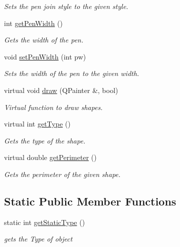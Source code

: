 \begin{DoxyCompactItemize}
\begin{DoxyCompactList}\small\item\em Sets the pen join style to the given style. \end{DoxyCompactList}\item 
int \hyperlink{classPolyline_ab01dd06f45e43dc9e6617596065fee70}{get\+Pen\+Width} ()
\begin{DoxyCompactList}\small\item\em Gets the width of the pen. \end{DoxyCompactList}\item 
void \hyperlink{classPolyline_aeb5424c425e44adff787367a497fc024}{set\+Pen\+Width} (int pw)
\begin{DoxyCompactList}\small\item\em Sets the width of the pen to the given width. \end{DoxyCompactList}\item 
virtual void \hyperlink{classPolyline_ac5b5a4ac26b140a7dc30cc293638e3ee}{draw} (Q\+Painter \&, bool)
\begin{DoxyCompactList}\small\item\em Virtual function to draw shapes. \end{DoxyCompactList}\item 
virtual int \hyperlink{classPolyline_a6138f6313141e81d989622806476c3d2}{get\+Type} ()
\begin{DoxyCompactList}\small\item\em Gets the type of the shape. \end{DoxyCompactList}\item 
virtual double \hyperlink{classPolyline_ad5425297b32d53a0f74eda253d4540f7}{get\+Perimeter} ()
\begin{DoxyCompactList}\small\item\em Gets the perimeter of the given shape. \end{DoxyCompactList}\end{DoxyCompactItemize}
\subsection*{Static Public Member Functions}
\begin{DoxyCompactItemize}
\item 
static int \hyperlink{classPolyline_abe58d8a06186437737d4c2f856328855}{get\+Static\+Type} ()
\begin{DoxyCompactList}\small\item\em gets the Type of object \end{DoxyCompactList}\end{DoxyCompactItemize}


